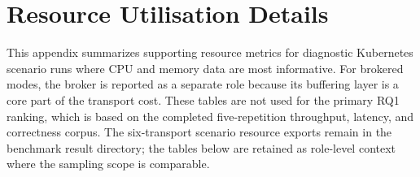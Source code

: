 \section{Resource Utilisation Details}
\label{app:resource-details}

This appendix summarizes supporting resource metrics for diagnostic Kubernetes scenario runs where CPU and memory data are most informative. For brokered modes, the broker is reported as a separate role because its buffering layer is a core part of the transport cost. These tables are not used for the primary RQ1 ranking, which is based on the completed five-repetition throughput, latency, and correctness corpus. The six-transport scenario resource exports remain in the benchmark result directory; the tables below are retained as role-level context where the sampling scope is comparable.

\begin{table}[H]
    \centering
    \scriptsize
    \caption{Continuous scenario CPU usage by role (avg./peak \%).}
    \label{tab:appendix-continuous-cpu}
    \setlength{\tabcolsep}{3pt}
\end{table}

